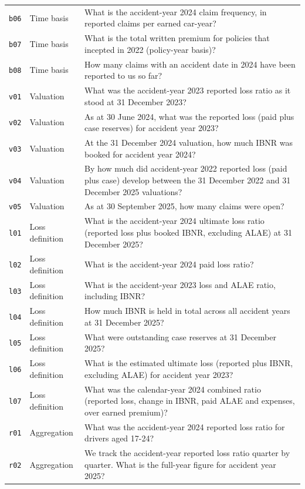 {\begin{longtable}{p{0.6cm}p{2.2cm}p{11.5cm}}
\texttt{b06} & Time basis & What is the accident-year 2024 claim frequency, in reported claims per earned car-year? \\
\texttt{b07} & Time basis & What is the total written premium for policies that incepted in 2022 (policy-year basis)? \\
\texttt{b08} & Time basis & How many claims with an accident date in 2024 have been reported to us so far? \\
\texttt{v01} & Valuation & What was the accident-year 2023 reported loss ratio as it stood at 31 December 2023? \\
\texttt{v02} & Valuation & As at 30 June 2024, what was the reported loss (paid plus case reserves) for accident year 2023? \\
\texttt{v03} & Valuation & At the 31 December 2024 valuation, how much IBNR was booked for accident year 2024? \\
\texttt{v04} & Valuation & By how much did accident-year 2022 reported loss (paid plus case) develop between the 31 December 2022 and 31 December 2025 valuations? \\
\texttt{v05} & Valuation & As at 30 September 2025, how many claims were open? \\
\texttt{l01} & Loss definition & What is the accident-year 2024 ultimate loss ratio (reported loss plus booked IBNR, excluding ALAE) at 31 December 2025? \\
\texttt{l02} & Loss definition & What is the accident-year 2024 paid loss ratio? \\
\texttt{l03} & Loss definition & What is the accident-year 2023 loss and ALAE ratio, including IBNR? \\
\texttt{l04} & Loss definition & How much IBNR is held in total across all accident years at 31 December 2025? \\
\texttt{l05} & Loss definition & What were outstanding case reserves at 31 December 2025? \\
\texttt{l06} & Loss definition & What is the estimated ultimate loss (reported plus IBNR, excluding ALAE) for accident year 2023? \\
\texttt{l07} & Loss definition & What was the calendar-year 2024 combined ratio (reported loss, change in IBNR, paid ALAE and expenses, over earned premium)? \\
\texttt{r01} & Aggregation & What was the accident-year 2024 reported loss ratio for drivers aged 17-24? \\
\texttt{r02} & Aggregation & We track the accident-year reported loss ratio quarter by quarter. What is the full-year figure for accident year 2025? \\

\end{longtable}}
